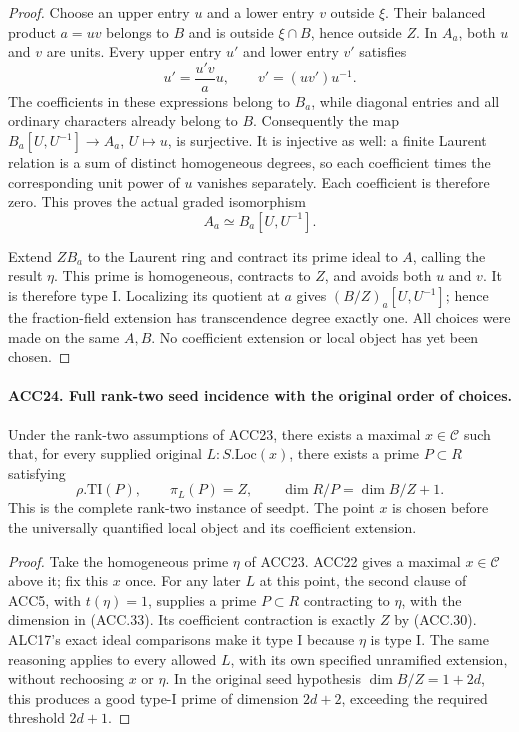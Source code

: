 \begin{proof}
Choose an upper entry \(u\) and a lower entry \(v\) outside
\(\xi\).  Their balanced product \(a=uv\) belongs to \(B\)
and is outside \(\xi\cap B\), hence outside \(Z\).
In \(A_a\), both \(u\) and \(v\) are units.  Every upper
entry \(u'\) and lower entry \(v'\) satisfies
\[
                   u'=\frac{u'v}{a}u,\qquad
                   v'=(uv')u^{-1}.                        \tag{ACC.31}
\]
The coefficients in these expressions belong to \(B_a\), while
diagonal entries and all ordinary characters already belong to
\(B\).  Consequently the map
\(B_a[U,U^{-1}]\to A_a\), \(U\mapsto u\), is surjective.
It is injective as well: a finite Laurent relation is a sum of
distinct homogeneous degrees, so each coefficient times the
corresponding unit power of \(u\) vanishes separately.  Each
coefficient is therefore zero.  This proves the actual graded
isomorphism
\[
                         A_a\simeq B_a[U,U^{-1}].         \tag{ACC.32}
\]

Extend \(ZB_a\) to the Laurent ring and contract its prime
ideal to \(A\), calling the result \(\eta\).  This prime
is homogeneous, contracts to \(Z\), and avoids both \(u\)
and \(v\).  It is therefore type I.  Localizing its quotient
at \(a\) gives \((B/Z)_a[U,U^{-1}]\); hence the fraction-field
extension has transcendence degree exactly one.  All choices were
made on the same \(A,B\).  No coefficient extension or local
object has yet been chosen.
\end{proof}

\paragraph{ACC24. Full rank-two seed incidence with the original order of choices.}
\label{claim:ACC24}
Under the rank-two assumptions of ACC23, there exists a maximal
\(x\in\mathcal C\) such that, for every supplied original
\(L:S.\mathrm{Loc}(x)\), there exists a prime \(P\subset R\)
satisfying
\[
 \rho.\mathrm{TI}(P),\qquad \pi_L(P)=Z,\qquad
                      \dim R/P=\dim B/Z+1.               \tag{ACC.33}
\]
This is the complete rank-two instance of \(\mathrm{seedpt}\).
The point \(x\) is chosen before the universally quantified
local object and its coefficient extension.

\begin{proof}
Take the homogeneous prime \(\eta\) of ACC23.  ACC22 gives a
maximal \(x\in\mathcal C\) above it; fix this \(x\) once.
For any later \(L\) at this point, the second clause of ACC5,
with \(t(\eta)=1\), supplies a prime \(P\subset R\)
contracting to \(\eta\), with the dimension in (ACC.33).
Its coefficient contraction is exactly \(Z\) by (ACC.30).
ALC17's exact ideal comparisons make it type I because \(\eta\)
is type I.  The same reasoning applies to every allowed \(L\),
with its own specified unramified extension, without rechoosing
\(x\) or \(\eta\).  In the original seed hypothesis
\(\dim B/Z=1+2d\), this produces a good type-I prime of
dimension \(2d+2\), exceeding the required threshold \(2d+1\).
\end{proof}

